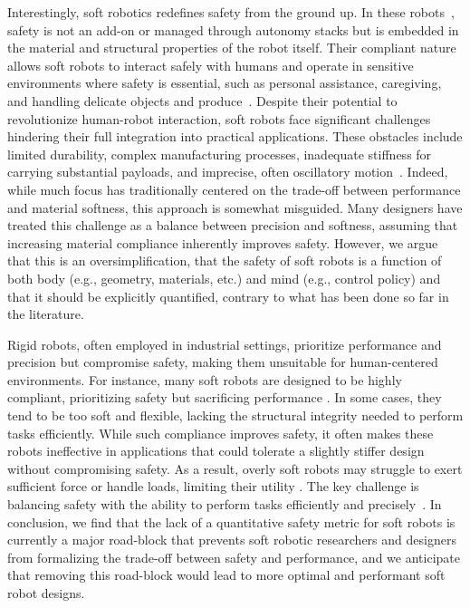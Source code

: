 Interestingly, soft robotics redefines safety from the ground up. 
In these robots~\citep{rus2015design, laschi2016soft}, safety is not an add-on or managed through autonomy stacks but is embedded in the material and structural properties of the robot itself. 
Their compliant nature allows soft robots to interact safely with humans and operate in sensitive environments where safety is essential, such as personal assistance, caregiving, and handling delicate objects and produce~\citep{abidi2017intrinsic}. 
Despite their potential to revolutionize human-robot interaction, soft robots face significant challenges hindering their full integration into practical applications. These obstacles include limited durability, complex manufacturing processes, inadequate stiffness for carrying substantial payloads, and imprecise, often oscillatory motion~\citep{mazzolai2022roadmap, majidi2014soft, hawkes2017soft}. 
Indeed, while much focus has traditionally centered on the trade-off between performance and material softness, this approach is somewhat misguided. 
Many designers have treated this challenge as a balance between precision and softness, assuming that increasing material compliance inherently improves safety.
However, we argue that this is an oversimplification, that the safety of soft robots is a function of both body (e.g., geometry, materials, etc.) and mind (e.g., control policy) and that it should be explicitly quantified, contrary to what has been done so far in the literature.

Rigid robots, often employed in industrial settings, prioritize performance and precision but compromise safety, making them unsuitable for human-centered environments.
For instance, many soft robots are designed to be highly compliant, prioritizing safety but sacrificing performance \citep{cianchetti2013stiff}. 
In some cases, they tend to be too soft and flexible, lacking the structural integrity needed to perform tasks efficiently. 
While such compliance improves safety, it often makes these robots ineffective in applications that could tolerate a slightly stiffer design without compromising safety. 
As a result, overly soft robots may struggle to exert sufficient force or handle loads, limiting their utility \citep{iida2011soft}.
The key challenge is balancing safety with the ability to perform tasks efficiently and precisely~\citep{khanna2022human}.
In conclusion, we find that the lack of a quantitative safety metric for soft robots is currently a major road-block that prevents soft robotic researchers and designers from formalizing the trade-off between safety and performance, and we anticipate that removing this road-block would lead to more optimal and performant soft robot designs.

